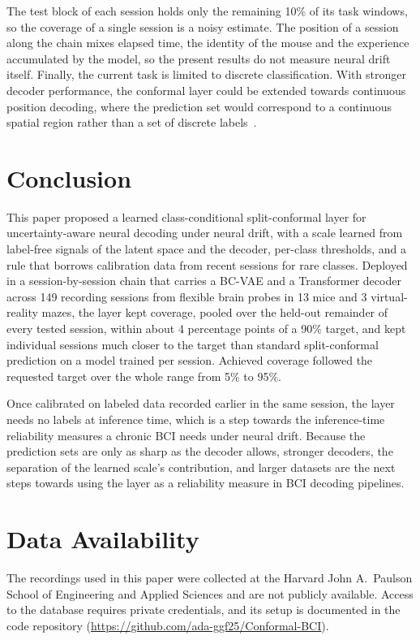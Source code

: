 \documentclass{article}
\begin{document}
The test block of each session holds only the remaining 10\% of its task windows, so the coverage of a single session is a noisy estimate. The position of a session along the chain mixes elapsed time, the identity of the mouse and the experience accumulated by the model, so the present results do not measure neural drift itself. Finally, the current task is limited to discrete classification. With stronger decoder performance, the conformal layer could be extended towards continuous position decoding, where the prediction set would correspond to a continuous spatial region rather than a set of discrete labels~\cite{angelopoulos2022a}.

\section{Conclusion}
This paper proposed a learned class-conditional split-conformal layer for uncertainty-aware neural decoding under neural drift, with a scale learned from label-free signals of the latent space and the decoder, per-class thresholds, and a rule that borrows calibration data from recent sessions for rare classes. Deployed in a session-by-session chain that carries a BC-VAE and a Transformer decoder across 149 recording sessions from flexible brain probes in 13 mice and 3 virtual-reality mazes, the layer kept coverage, pooled over the held-out remainder of every tested session, within about 4 percentage points of a 90\% target, and kept individual sessions much closer to the target than standard split-conformal prediction on a model trained per session. Achieved coverage followed the requested target over the whole range from 5\% to 95\%.

Once calibrated on labeled data recorded earlier in the same session, the layer needs no labels at inference time, which is a step towards the inference-time reliability measures a chronic BCI needs under neural drift. Because the prediction sets are only as sharp as the decoder allows, stronger decoders, the separation of the learned scale's contribution, and larger datasets are the next steps towards using the layer as a reliability measure in BCI decoding pipelines.

\section*{Data Availability}
The recordings used in this paper were collected at the Harvard John A.\ Paulson School of Engineering and Applied Sciences and are not publicly available. Access to the database requires private credentials, and its setup is documented in the code repository (\url{https://github.com/ada-ggf25/Conformal-BCI}).
\end{document}
